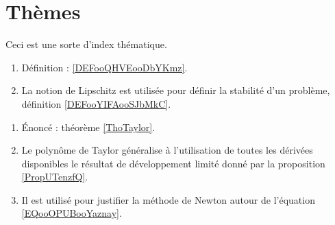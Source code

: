 
\section*{Thèmes}

Ceci est une sorte d'index thématique.


    \begin{enumerate}
    \item
        Définition : \ref{DEFooQHVEooDbYKmz}.
    \item
        La notion de Lipschitz est utilisée pour définir la stabilité d'un problème, définition \ref{DEFooYIFAooSJbMkC}.
    \end{enumerate}

    \begin{enumerate}
    \item
        Énoncé : théorème \ref{ThoTaylor}.
        \item
            Le polynôme de Taylor généralise à l'utilisation de toutes les dérivées disponibles le résultat de développement limité donné par la proposition \ref{PropUTenzfQ}.
        \item
            Il est utilisé pour justifier la méthode de Newton autour de l'équation \eqref{EQooOPUBooYaznay}.
        \end{enumerate}

